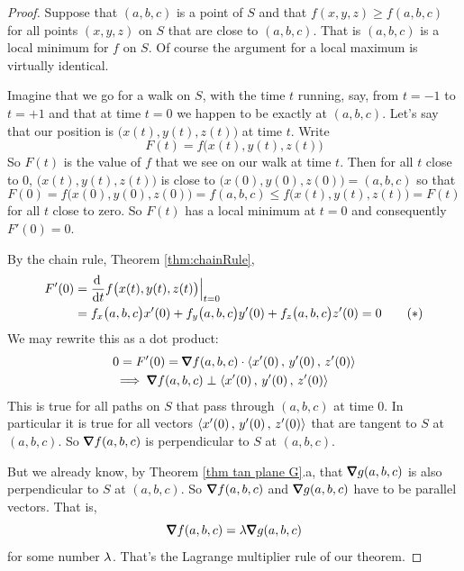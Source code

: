 \begin{proof} 
Suppose that $(a,b,c)$ is a
point of $S$ and that $f(x,y,z)\ge f(a,b,c)$ for all points $(x,y,z)$ on $S$ 
that are close to $(a,b,c)$. That is $(a,b,c)$ is a local minimum for $f$ 
on $S$. Of course the argument for a local maximum is virtually identical.

Imagine that we go for a walk on $S$, with the time $t$ running, say, 
from $t=-1$ to $t=+1$ and that at time $t=0$ we happen to be exactly
at $(a,b,c)$. Let's say that our position is $\big(x(t),y(t),z(t)\big)$ 
at time $t$. 
Write
\begin{equation*}
F(t) = f\big(x(t),y(t),z(t)\big)
\end{equation*}
So $F(t)$ is the value of $f$ that we see on our walk at time $t$. Then
for all $t$ close to $0$, $\big(x(t),y(t),z(t)\big)$ is close
to $\big(x(0),y(0),z(0)\big)=(a,b,c)$ so that
\begin{equation*}
F(0) = f\big(x(0),y(0),z(0)\big)
     = f(a,b,c)
     \le f\big(x(t),y(t),z(t)\big)
     =F(t)
\end{equation*}
for all $t$ close to zero. So $F(t)$ has a local minimum at $t=0$ 
and consequently $F'(0)=0$.
  
By the chain rule, Theorem \ref{thm:chainRule},
\begin{align*}
F'(0) &= \diff{}{t}f\big(x(t),y(t),z(t)\big)\Big|_{t=0} \\
      &=f_x\big(a,b,c\big) x'(0)+f_y\big(a,b,c\big) y'(0)
               +f_z\big(a,b,c\big) z'(0)
       =0
\tag{$*$}\end{align*}
We may rewrite this as a dot product:
\begin{align*}
&0=F'(0)=\vnabla f(a,b,c)\cdot\llt x'(0)\,,\,y'(0)\,,\,z'(0)\rgt \\
&\implies \vnabla f(a,b,c) \perp \llt x'(0)\,,\,y'(0)\,,\,z'(0)\rgt
\end{align*}
This is true for all paths on $S$ that pass through $(a,b,c)$ at time $0$.
In particular it is true for all vectors $\left< x'(0)\,,\,y'(0)\,,\,z'(0)\right>$
that are tangent to $S$ at $(a,b,c)$. So $\vnabla f(a,b,c)$ is perpendicular
to $S$ at $(a,b,c)$. 

But we already know, by Theorem \ref{thm tan plane G}.a,
that $\vnabla g(a,b,c)$ is also perpendicular to $S$ at $(a,b,c)$. 
So $\vnabla f(a,b,c)$ and $\vnabla g(a,b,c)$ have to be parallel vectors.
That is,
\begin{equation*}
\vnabla f(a,b,c) = \la \vnabla g(a,b,c)
\end{equation*}
for some number $\lambda$. That's the Lagrange multiplier rule of our 
theorem.
\end{proof}

